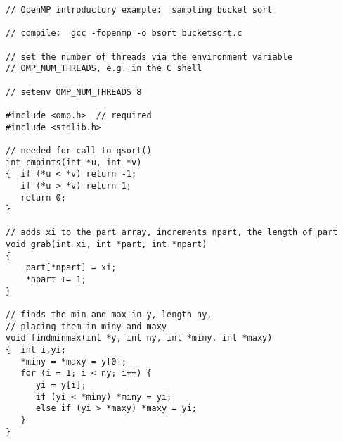 \begin{lstlisting}
// OpenMP introductory example:  sampling bucket sort

// compile:  gcc -fopenmp -o bsort bucketsort.c

// set the number of threads via the environment variable
// OMP_NUM_THREADS, e.g. in the C shell

// setenv OMP_NUM_THREADS 8

#include <omp.h>  // required
#include <stdlib.h>

// needed for call to qsort()
int cmpints(int *u, int *v)
{  if (*u < *v) return -1;
   if (*u > *v) return 1;
   return 0;
}

// adds xi to the part array, increments npart, the length of part
void grab(int xi, int *part, int *npart)
{
    part[*npart] = xi;
    *npart += 1;
}

// finds the min and max in y, length ny,
// placing them in miny and maxy
void findminmax(int *y, int ny, int *miny, int *maxy)
{  int i,yi;
   *miny = *maxy = y[0];
   for (i = 1; i < ny; i++) {
      yi = y[i];
      if (yi < *miny) *miny = yi;
      else if (yi > *maxy) *maxy = yi;
   }
}


\end{lstlisting}
